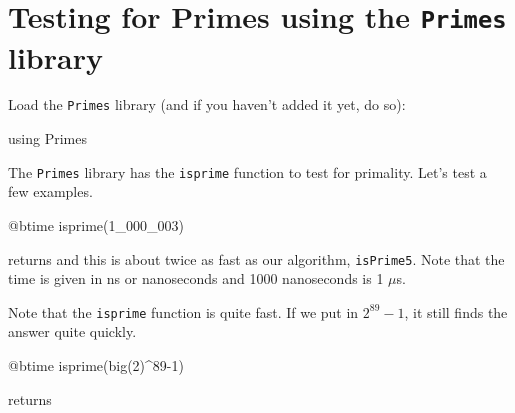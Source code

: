 \section{\texorpdfstring{Testing for Primes using the \texttt{Primes} library}{Testing for Primes using the Primes library}}

Load the \texttt{Primes} library (and if you haven't added it yet, do
so):

\begin{jlblock}[nt]
using Primes
\end{jlblock}

The \texttt{Primes} library has the \texttt{isprime} function to test
for primality. Let's test a few examples.

\begin{jlblock}[nt]
@btime isprime(1_000_003)
\end{jlblock}
returns  \printpythontex[verbatim]
%
and this is about twice as fast as our algorithm, \texttt{isPrime5}.  Note that the time is given in ns or nanoseconds and 1000 nanoseconds is 1 $\mu$s. 


Note that the \texttt{isprime} function is quite fast.  If we put in $2^{89}-1$, it still finds the answer quite quickly.   
\begin{jlblock}[nt]
@btime isprime(big(2)^89-1)
\end{jlblock}
returns  \printpythontex[verbatim]





